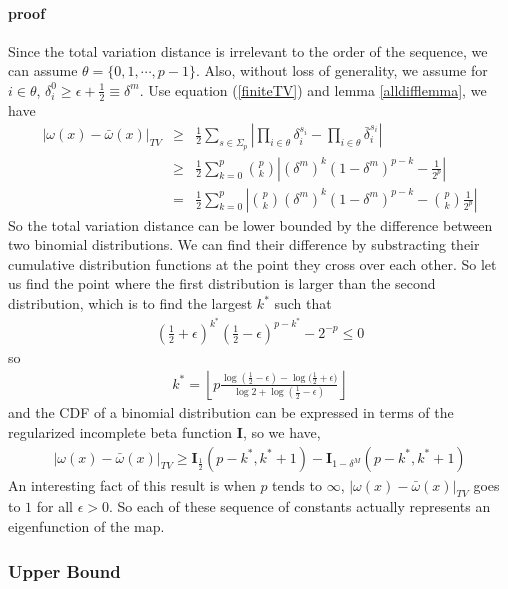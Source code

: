 \documentclass{article}
\begin{document}
\paragraph{proof}
Since the total variation distance is irrelevant to the order of the sequence, we can assume $\theta=\{0,1,\cdots,p-1\}$. Also, without loss of generality, we assume for $i\in \theta$, $\delta^0_i \ge \epsilon+\frac{1}{2}\equiv \delta^m$. Use equation (\ref{finiteTV}) and lemma \ref{alldifflemma}, we have
\begin{eqnarray} 
|\omega(x)-\bar{\omega}(x)|_{TV} 
                     & \ge &\frac{1}{2} \sum_{s\in\Sigma_p}  \left| \prod_{i\in \theta}\delta_i^{s_i}-\prod_{i\in\theta}\bar{\delta}_i^{s_i}  \right| \\
                     & \ge &\frac{1}{2}  \sum_{k=0}^p {p \choose k} \left|(\delta^m)^k (1-\delta^m)^{p-k} - \frac{1}{2^p} \right| \\  
                     & =   &\frac{1}{2}  \sum_{k=0}^p \left|{p \choose k} (\delta^m)^k (1-\delta^m)^{p-k} -{p \choose k} \frac{1}{2^p} \right|
\end{eqnarray} 
So the total variation distance can be lower bounded by the difference between two binomial distributions. We can find their difference by substracting their cumulative distribution functions at the point they cross over each other. So let us find the point where the first distribution is larger than the second distribution, which is to find the largest $k^*$ such that
\begin{eqnarray}
(\frac{1}{2}+\epsilon)^{k^*}(\frac{1}{2}-\epsilon)^{p-k^*}-2^{-p} \le 0
\end{eqnarray} 
so 
\begin{eqnarray}
k^* =  \left\lfloor p \frac{\log{(\frac{1}{2}-\epsilon)}-\log{(\frac{1}{2}+\epsilon})}{\log{2}+\log{(\frac{1}{2}-\epsilon)} }  \right\rfloor
\end{eqnarray}
and the CDF of a binomial distribution can be expressed in terms of the regularized incomplete beta function $\mathbf{I}$, so we have,
\begin{eqnarray}
|\omega(x)-\bar{\omega}(x)|_{TV} \ge \mathbf{I}_{\frac{1}{2}}(p-k^*,k^*+1) - \mathbf{I}_{1-\delta^M}(p-k^*,k^*+1)
\end{eqnarray}
An interesting fact of this result is when $p$ tends to $\infty$, $|\omega(x)-\bar{\omega}(x)|_{TV}$ goes to $1$ for all $\epsilon>0$. So each of these sequence of constants actually represents an eigenfunction of the map. 
\subsubsection{Upper Bound}
\end{document}
